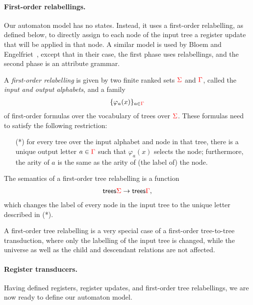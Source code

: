 \paragraph*{First-order relabellings.} Our automaton model has no states. Instead, it uses a first-order relabelling, as defined below, to  directly assign to each node of the input tree a register update that will be applied in that node. A similar model is used by    Bloem and Engelfriet~\cite[Theorem 17]{bloem_comparison_2000}, except that in their case, the first phase uses  \mso relabellings, and the second phase is   an attribute grammar. 


\begin{definition} \label{def:forat}  A \emph{first-order relabelling} is given by two finite ranked sets ${\color{red}{\Sigma}}$ and ${\color{red}{\Gamma}}$, called the \emph{input and output alphabets}, and a family 
    \begin{align*}
    \{\varphi_a(x)\}_{a \in {\color{red}{\Gamma}}}
    \end{align*}
    of first-order formulas over the vocabulary of trees over  ${\color{red}{\Sigma}}$. These formulas need to satisfy the following restriction:
    \begin{enumerate}
        \item[(*)] for every tree over the input alphabet and node in that tree, there is a unique output letter $a \in {\color{red}{\Gamma}}$ such that $\varphi_a(x)$ selects the node; furthermore, the arity of $a$ is the same as the arity of (the label of) the  node. 
    \end{enumerate}
The semantics of a  first-order tree relabelling is a function 
\begin{align*}
\mathsf {trees} {\color{red}{\Sigma}} \to \mathsf {trees} {\color{red}{\Gamma}},
\end{align*}
which changes the label of every node in the input tree to the unique letter described in  (*). 
      \end{definition}


A first-order tree relabelling is a very special case of a first-order tree-to-tree transduction, where only the labelling of the input tree is changed, while the universe as well as the child and descendant relations are not affected. 

\paragraph*{Register transducers.} Having defined registers, register updates, and first-order tree relabellings, we are now ready to define our automaton model.


